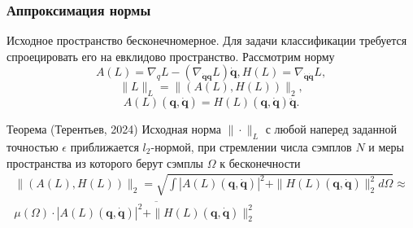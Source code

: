 \documentclass{beamer}
\begin{document}
\begin{frame}
\frametitle{Аппроксимация нормы}
Исходное пространство бесконечномерное. Для задачи классификации требуется спроецировать его на евклидово пространство. Рассмотрим норму
$$A(L) = \nabla_{q} L-\left(\nabla_{\dot{\mathbf{q}}\mathbf{q}} L\right) \dot{\mathbf{q}}, H(L) = \nabla_{\dot{\mathbf{q}} \dot{\mathbf{q}}} L,$$
$$\|L\|_L = \|(A(L), H(L))\|_2,$$
\begin{equation*}
A(L)(\mathbf{q}, \dot{\mathbf{q}}) = H(L)(\mathbf{q}, \dot{\mathbf{q}})\ddot{\mathbf{q}}.
\end{equation*}

\begin{block} {Теорема (Терентьев, 2024)}
Исходная норма $\|\cdot\|_L$ с любой наперед заданной точностью $\epsilon$ приближается $l_2$-нормой, при стремлении числа сэмплов $N$ и меры пространства из которого берут сэмплы $\Omega$ к бесконечности
\[
\begin{split}
    \|(A(L),  H(L))\|_2 = \sqrt{\int |A(L)\left(\mathbf{q}, \dot{\mathbf{q}}\right)|^2 + \|H(L)\left(\mathbf{q}, \dot{\mathbf{q}}\right)\|_2^2  d\Omega} \approx
\\
\mu(\Omega) \cdot \overline{|A(L)\left(\mathbf{q}, \dot{\mathbf{q}}\right)|^2 + \|H(L)\left(\mathbf{q}, \dot{\mathbf{q}}\right)\|_2^2}
\end{split}
\]
\end{block} 
\end{frame}
\end{document}
